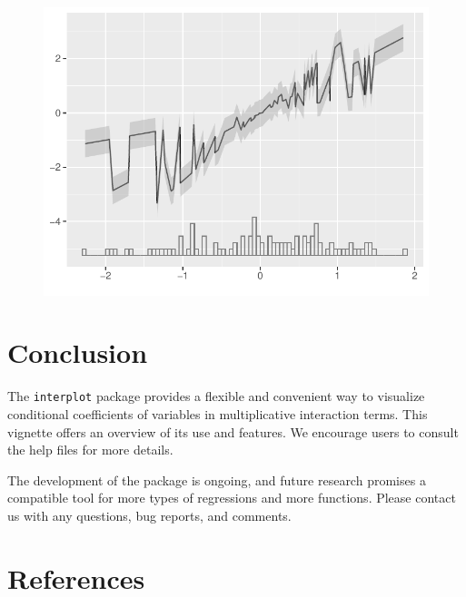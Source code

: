 \documentclass[
  article]{jss}
\begin{document}
\begin{figure}[H]

{\centering \includegraphics{jss_manuscript_files/figure-pdf/unnamed-chunk-20-1.pdf}

}

\end{figure}

\hypertarget{conclusion}{%
\section{Conclusion}\label{conclusion}}

The \texttt{interplot} package provides a flexible and convenient way to
visualize conditional coefficients of variables in multiplicative
interaction terms. This vignette offers an overview of its use and
features. We encourage users to consult the help files for more details.

The development of the package is ongoing, and future research promises
a compatible tool for more types of regressions and more functions.
Please contact us with any questions, bug reports, and comments.

\hypertarget{sec-references}{%
\section*{References}\label{sec-references}}

\renewcommand{\bibsection}{}

\end{document}

